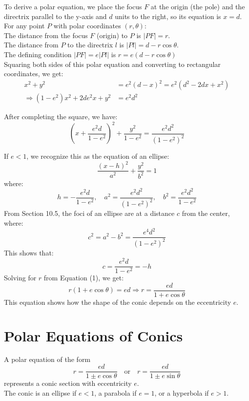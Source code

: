 \documentclass{article}
\begin{document}
To derive a polar equation, we place the focus $F$ at the origin (the pole) and the directrix parallel to the y-axis and $d$ units to the right, so its equation is $x=d$. 
\\For any point $P$ with polar coordinates $(r, \theta)$:\\
The distance from the focus $F$ (origin) to $P$ is $|PF| = r$.\\
The distance from $P$ to the directrix $l$ is $|Pl| = d - r \cos\theta$.\\
The defining condition $|PF| = e|Pl|$ is $r = e(d - r \cos\theta)$\\

Squaring both sides of this polar equation and converting to rectangular coordinates, we get:
\begin{align*}
    x^2 + y^2 &= e^2(d - x)^2 = e^2(d^2 - 2dx + x^2) \\
    \Rightarrow (1 - e^2)x^2 + 2de^2x + y^2 &= e^2d^2
\end{align*}

After completing the square, we have:
\[
\left(x + \dfrac{e^2d}{1 - e^2}\right)^2 + \dfrac{y^2}{1 - e^2} = \dfrac{e^2d^2}{(1 - e^2)^2}
\]

If $e < 1$, we recognize this as the equation of an ellipse:
\[
\dfrac{(x - h)^2}{a^2} + \dfrac{y^2}{b^2} = 1
\]
where:
\[
h = -\dfrac{e^2d}{1 - e^2}, \quad a^2 = \dfrac{e^2d^2}{(1 - e^2)^2}, \quad b^2 = \dfrac{e^2d^2}{1 - e^2}
\]
From Section 10.5, the foci of an ellipse are at a distance $c$ from the center, where:
\[
c^2 = a^2 - b^2 = \dfrac{e^4d^2}{(1 - e^2)^2}
\]
This shows that:
\[
c = \dfrac{e^2d}{1 - e^2} = -h
\]
Solving for $r$ from Equation (1), we get:
\[
r(1 + e \cos\theta) = ed \Rightarrow r = \dfrac{ed}{1 + e \cos\theta}
\]
This equation shows how the shape of the conic depends on the eccentricity $e$.

\section*{Polar Equations of Conics}
\begin{tcolorbox}[
    colback=white!,   %
    colframe=orange!80!white, %
    title=Conics Defined by polar coordinates,   %
    boxrule=0.5mm,          %
    arc=3mm               %
    ]
    A polar equation of the form
    \[
    r = \dfrac{ed}{1 \pm e \cos\theta} \quad \text{or} \quad r = \dfrac{ed}{1 \pm e \sin\theta}
    \]
    represents a conic section with eccentricity $e$.\\ 
    The conic is an ellipse if $e < 1$, a parabola if $e = 1$, or a hyperbola if $e > 1$.
\end{tcolorbox}
\end{document}
